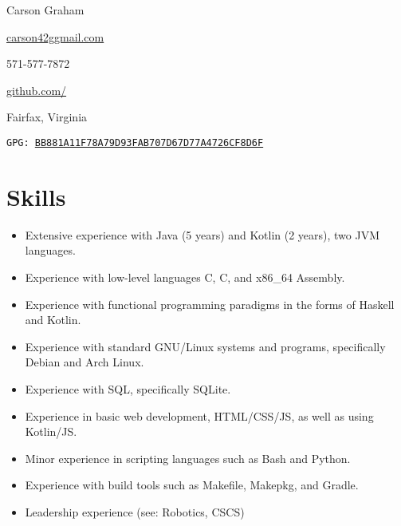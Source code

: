 \documentclass[10pt,letterpaper]{article}
\makeatletter
\def\link#1#2{\color{blue!60!black}\href{#1}{#2}\color{black}}
\newcommand{\CPP}
{C\nolinebreak[4]\hspace{-.05em}\raisebox{.35ex}{\footnotesize\bf ++}}
\newcommand{\email}
{carson42g\raisebox{-0.2ex}{@}gmail.com}
\newcommand{\github}
{github.com\hspace{-0.007em}/\hspace{-0.05em}{mee42}}
\def\code#1{\texttt{#1}}
\def\paddedItem#1{\vspace{-0.4em}\item #1}
\makeatother
\begin{document}
    \thispagestyle{empty}
    \begin{center}
        \huge Carson Graham
    \end{center}

    \begin{adjustwidth}{0em}{0em}
        \begin{multicols}{4}
            \begin{center}
                \link{mailto:carson42g@gmail.com}{\email}
            \end{center}
            \columnbreak
            \begin{center}
                571-577-7872
            \end{center}
            \columnbreak
            \begin{center}
                \link{https://github.com/mee42/}{\github}
            \end{center}
            \columnbreak
            \begin{center}
                Fairfax, Virginia
            \end{center}
        \end{multicols}
    \end{adjustwidth}
    \vspace{-1em}
    \begin{center}
        \code{GPG: \link{https://keys.openpgp.org/search?q=BB881A11F78A79D93FAB707D67D77A4726CF8D6F}{BB881A11F78A79D93FAB707D67D77A4726CF8D6F}}
     \end{center}

        

    \section*{Skills}

    \begin{itemize}
        \paddedItem Extensive experience with Java (5 years) and Kotlin (2 years), two JVM languages.
        \paddedItem Experience with low-level languages C, \CPP, and x86\_64 Assembly.
        \paddedItem Experience with functional programming paradigms in the forms of Haskell and Kotlin.
        \paddedItem Experience with standard GNU/Linux systems and programs, specifically Debian and Arch Linux.
        \paddedItem Experience with SQL, specifically SQLite.
        \paddedItem Experience in basic web development, HTML/CSS/JS, as well as using Kotlin/JS.
        \paddedItem Minor experience in scripting languages such as Bash and Python.
        \paddedItem Experience with build tools such as Makefile, Makepkg, and Gradle.
        \paddedItem Leadership experience (see: Robotics, CSCS)
    \end{itemize}
\end{document}
